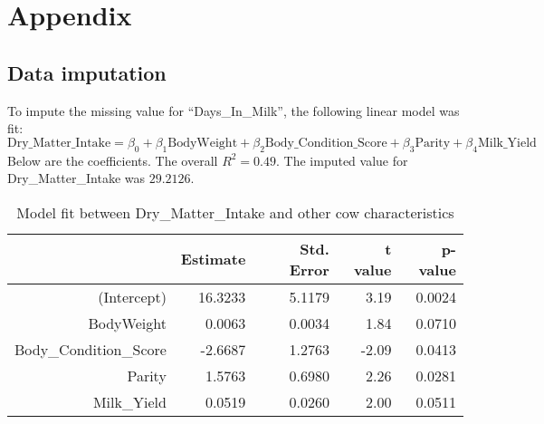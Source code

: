 \section*{Appendix} \label{Appendix}
\subsection*{Data imputation}
\noindent
To impute the missing value for ``Days\_In\_Milk'', the following linear model was fit:
\[ \text{Dry\_Matter\_Intake} = \beta_0 + \beta_1 \text{BodyWeight} + \beta_2 \text{Body\_Condition\_Score} + \beta_3 \text{Parity} + \beta_4 \text{Milk\_Yield}  \]
Below are the coefficients. The overall $R^2 = 0.49$. The imputed value for Dry\_Matter\_Intake was $29.2126$. 
\begin{table}[ht]
\centering
\begin{tabular}{rrrrr}
  \hline
  & Estimate & Std. Error & t value & p-value \\ 
  \hline
 (Intercept) & 16.3233 & 5.1179 & 3.19 & 0.0024 \\ 
  BodyWeight & 0.0063 & 0.0034 & 1.84 & 0.0710 \\ 
  Body\_Condition\_Score & -2.6687 & 1.2763 & -2.09 & 0.0413 \\ 
  Parity & 1.5763 & 0.6980 & 2.26 & 0.0281 \\ 
  Milk\_Yield & 0.0519 & 0.0260 & 2.00 & 0.0511 \\ 
  \hline
\end{tabular}
\caption{Model fit between Dry\_Matter\_Intake and other cow characteristics}
\end{table}

